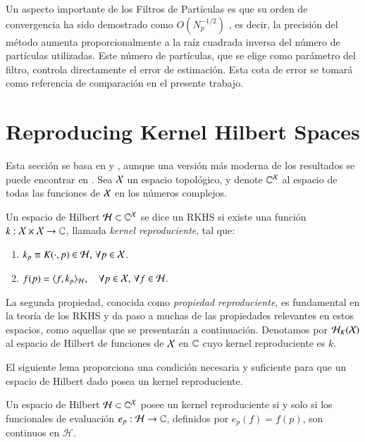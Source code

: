 Un aspecto importante de los Filtros de Partículas es que su orden de convergencia ha sido demostrado como $O(N_p^{-1/2})$ \cite{Crisan2002APractitioners, Chopin2020AnCarlo}, es decir, la precisión del método aumenta proporcionalmente a la raíz cuadrada inversa del número de partículas utilizadas. Este número de partículas, que se elige como parámetro del filtro, controla directamente el error de estimación. Esta cota de error se tomará como referencia de comparación en el presente trabajo.

\section{Reproducing Kernel Hilbert Spaces}
Esta sección se basa en \cite{Wendland2004ScatteredApproximation} y \cite{Berlinet2004ReproducingStatistics}, aunque una versión más moderna de los resultados se puede encontrar en \cite{Saitoh2016TheoryApplications}. Sea \( \mathcal{X} \) un espacio topológico, y denote \(\mathbb{C}^{\mathcal{X}}\) al espacio de todas las funciones de \( \mathcal{X} \) en los números complejos. 

\begin{defn}  
Un espacio de Hilbert \( \mathcal{H} \subset \mathbb{C}^{\mathcal{X}} \) se dice un RKHS si existe una función \( k: \mathcal{X} \times \mathcal{X} \to \mathbb{C} \), llamada \textit{kernel reproduciente}, tal que:
\begin{enumerate}
    \item \( k_p \equiv K(\cdot, p) \in \mathcal{H}, \, \forall p \in \mathcal{X} \).
    \item \( f(p) = \langle f, k_p \rangle_{\mathcal{H}}, \quad \forall p \in \mathcal{X}, \, \forall f \in \mathcal{H}. \)
\end{enumerate}
\end{defn}

\noindent La segunda propiedad, conocida como \textit{propiedad reproduciente}, es fundamental en la teoría de los RKHS y da paso a muchas de las propiedades relevantes en estos espacios, como aquellas que se presentarán a continuación. Denotamos por \( \mathcal{H}_K(\mathcal{X}) \) al espacio de Hilbert de funciones de \( \mathcal{X} \) en \( \mathbb{C} \) cuyo kernel reproduciente es \( k \).

El siguiente lema proporciona una condición necesaria y suficiente para que un espacio de Hilbert dado posea un kernel reproduciente.

\begin{lema}
Un espacio de Hilbert \( \mathcal{H} \subset \mathbb{C}^{\mathcal{X}} \) posee un kernel reproduciente si y solo si los funcionales de evaluación \( e_p: \mathcal{H} \to \mathbb{C} \), definidos por \( e_p(f) = f(p) \), son continuos en \( \mathcal{H} \).
\end{lema}

